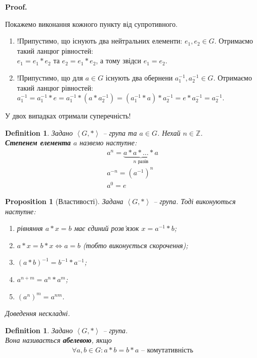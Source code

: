 \documentclass[a4paper, 10pt]{article}
\makeatletter
\theoremstyle{theoremdd}
\theoremstyle{theoremdd}
\newtheorem{definition}[theorem]{Definition}
\theoremstyle{theoremdd}
\theoremstyle{theoremdd}
\theoremstyle{theoremdd}
\theoremstyle{theoremdd}
\theoremstyle{theoremdd}
\theoremstyle{theoremdd}
\theoremstyle{theoremdd}
\newtheorem{proposition}[theorem]{Proposition}
\theoremstyle{theoremdd}
\theoremstyle{theoremdd}
\theoremstyle{theoremdd}
\theoremstyle{theoremdd}
\theoremstyle{theoremdd}
\theoremstyle{theoremdd}
\renewenvironment{proof}[1][Proof.\\]{\par
\pushQED{\hfill \qed}%
\normalfont \topsep6\p@\@plus6\p@\relax
\trivlist
\item\relax
{\bfseries
#1\@addpunct{.}}\hspace\labelsep\ignorespaces
}{%
\popQED\endtrivlist\@endpefalse
}
\makeatother
\begin{document}
\begin{proof}
Покажемо виконання кожного пункту від супротивного.
\begin{enumerate}[wide=0pt,label={\arabic*)}]
\item !Припустимо, що існують два нейтральних елементи: $e_1,e_2 \in G$. Отримаємо такий ланцюг рівностей:\\
$e_1 = e_1*e_2$ та $e_2 = e_1*e_2$, а тому звідси $e_1 = e_2$.

\item !Припустимо, що для $a \in G$ існують два обернени $a_1^{-1},a_2^{-1} \in G$. Отримаємо такий ланцюг рівностей:\\
$a_1^{-1} = a_1^{-1} * e = a_1^{-1} * (a*a_2^{-1}) = (a_1^{-1}*a)*a_2^{-1} = e*a_2^{-1} = a_2^{-1}$.
\end{enumerate}
У двох випадках отримали суперечність!
\end{proof}

\begin{definition}
Задано $\left< G, * \right>$ -- група та $a \in G$. Нехай $n \in \mathbb{Z}$.\\
\textbf{Степенем елемента} $a$ назвемо наступне:
\begin{align*}
a^n = \underbrace{a*a*\dots*a}_{n \text{ разів}} \\
a^{-n} = (a^{-1})^{n} \\
a^0 = e
\end{align*}
\end{definition}

\begin{proposition}[Властивості]
Задана $\left<G, *\right>$ -- група. Тоді виконуються наступне:
\begin{enumerate}[nosep, wide=0pt, label={\arabic*)}]
\item рівняння $a*x = b$ має єдиний розв'язок $x=a^{-1}*b$;
\item $a*x = b*x \iff a = b$ (тобто виконується скорочення);
\item $(a*b)^{-1} = b^{-1}*a^{-1}$;
\iffalse\textit{Аналогічно для $x*a=b$ та $x*a=x*b$ виконано}.\fi
\item $a^{n+m} = a^n*a^m$;
\item $(a^n)^m = a^{nm}$.
\end{enumerate}
\textit{Доведення нескладні.}
\end{proposition}

\begin{definition}
Задано $\left<G,* \right>$ -- група.\\
Вона називається \textbf{абелевою}, якщо
\begin{align*}
\forall a,b \in G: a*b = b*a \text{ -- комутативність}
\end{align*}
\end{definition}
\end{document}
